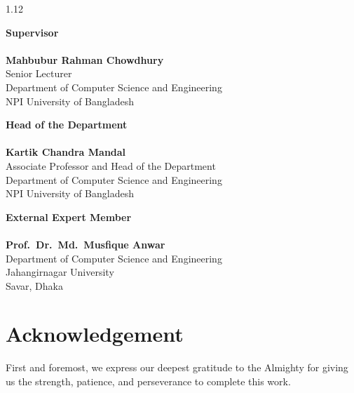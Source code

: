 \begin{spacing}{1.12}
\vspace{1.1cm}

\noindent
\begin{minipage}[t]{0.46\textwidth}
\centering
\textbf{Supervisor}\\[1.9cm]
\makebox[0.9\linewidth]{\dotfill}\\[0.8mm]
\textbf{Mahbubur Rahman Chowdhury}\\[0.4mm]
{\fontsize{9}{11.5}\selectfont Senior Lecturer\\
Department of Computer Science and Engineering\\
NPI University of Bangladesh}
\end{minipage}\hfill
\begin{minipage}[t]{0.46\textwidth}
\centering
\textbf{Head of the Department}\\[1.9cm]
\makebox[0.9\linewidth]{\dotfill}\\[0.8mm]
\textbf{Kartik Chandra Mandal}\\[0.4mm]
{\fontsize{9}{11.5}\selectfont Associate Professor and Head of the Department\\
Department of Computer Science and Engineering\\
NPI University of Bangladesh}
\end{minipage}

\vspace{2.1cm}
\begin{center}
\textbf{External Expert Member}\\[1.9cm]
\makebox[7.2cm]{\dotfill}\\[0.8mm]
\textbf{Prof.\ Dr.\ Md.\ Musfique Anwar}\\[0.4mm]
{\fontsize{9}{11.5}\selectfont Department of Computer Science and Engineering\\
Jahangirnagar University\\
Savar, Dhaka}
\end{center}
\end{spacing}
\clearpage

\chapter*{Acknowledgement}
\thispagestyle{plain}

First and foremost, we express our deepest gratitude to the Almighty for
giving us the strength, patience, and perseverance to complete this work.

